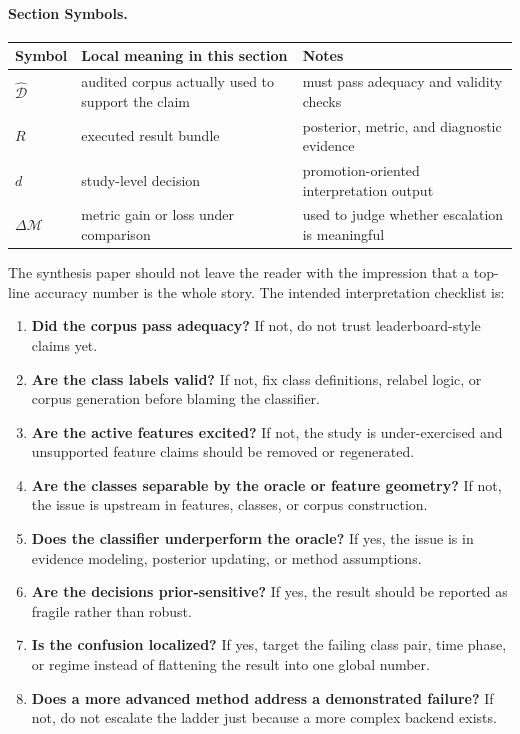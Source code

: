 \documentclass[11pt]{article}
\newcommand{\sectionsymbol}[3]{#1 & #2 & #3 \\}
\newcommand{\sectionsymbols}[1]{%
\begin{center}
\small
\setlength{\tabcolsep}{4pt}
\begin{tabularx}{0.95\textwidth}{>{\raggedright\arraybackslash}p{0.16\textwidth}X>{\raggedright\arraybackslash}p{0.18\textwidth}}
\toprule
Symbol & Local meaning in this section & Notes \\
\midrule
#1
\bottomrule
\end{tabularx}
\end{center}
}
\begin{document}
\paragraph{Section Symbols.}
\sectionsymbols{
\sectionsymbol{\(\widehat{\mathcal{D}}\)}{audited corpus actually used to support the claim}{must pass adequacy and validity checks}
\sectionsymbol{\(R\)}{executed result bundle}{posterior, metric, and diagnostic evidence}
\sectionsymbol{\(d\)}{study-level decision}{promotion-oriented interpretation output}
\sectionsymbol{\(\Delta \mathcal{M}\)}{metric gain or loss under comparison}{used to judge whether escalation is meaningful}
}

\noindent
The synthesis paper should not leave the reader with the impression that a top-line accuracy number is the whole story. The intended interpretation checklist is:
\begin{enumerate}[leftmargin=1.5em]
  \item \textbf{Did the corpus pass adequacy?} If not, do not trust leaderboard-style claims yet.
  \item \textbf{Are the class labels valid?} If not, fix class definitions, relabel logic, or corpus generation before blaming the classifier.
  \item \textbf{Are the active features excited?} If not, the study is under-exercised and unsupported feature claims should be removed or regenerated.
  \item \textbf{Are the classes separable by the oracle or feature geometry?} If not, the issue is upstream in features, classes, or corpus construction.
  \item \textbf{Does the classifier underperform the oracle?} If yes, the issue is in evidence modeling, posterior updating, or method assumptions.
  \item \textbf{Are the decisions prior-sensitive?} If yes, the result should be reported as fragile rather than robust.
  \item \textbf{Is the confusion localized?} If yes, target the failing class pair, time phase, or regime instead of flattening the result into one global number.
  \item \textbf{Does a more advanced method address a demonstrated failure?} If not, do not escalate the ladder just because a more complex backend exists.
\end{enumerate}
\end{document}
